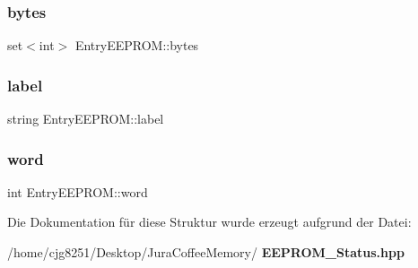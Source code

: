 \subsubsection{bytes}
{\footnotesize\ttfamily set$<$int$>$ Entry\+E\+E\+P\+R\+O\+M\+::bytes}

\mbox{\label{struct_entry_e_e_p_r_o_m_abdba61f5a81a7b4d99159271ef11df3b}} 
\subsubsection{label}
{\footnotesize\ttfamily string Entry\+E\+E\+P\+R\+O\+M\+::label}

\mbox{\label{struct_entry_e_e_p_r_o_m_a183abe74905c3ff64dec46b7c322527f}} 
\subsubsection{word}
{\footnotesize\ttfamily int Entry\+E\+E\+P\+R\+O\+M\+::word}



Die Dokumentation für diese Struktur wurde erzeugt aufgrund der Datei\+:\begin{DoxyCompactItemize}
\item 
/home/cjg8251/\+Desktop/\+Jura\+Coffee\+Memory/\textbf{ E\+E\+P\+R\+O\+M\+\_\+\+Status.\+hpp}\end{DoxyCompactItemize}
